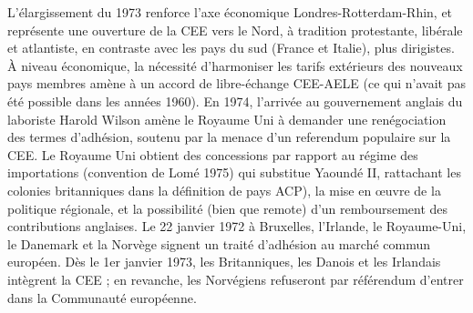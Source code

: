 \documentclass{report}%
\begin{document}
L’élargissement du 1973 renforce l’axe économique Londres-Rotterdam-Rhin, et représente une ouverture de la CEE vers le Nord, à tradition protestante, libérale et atlantiste, en contraste avec les pays du sud (France et Italie), plus dirigistes. À niveau économique, la nécessité d’harmoniser les tarifs extérieurs des nouveaux pays membres amène à un accord de libre-échange CEE-AELE (ce qui n’avait pas été possible dans les années 1960).
En 1974, l’arrivée au gouvernement anglais du laboriste Harold Wilson amène le Royaume Uni à demander une renégociation des termes d’adhésion, soutenu par la menace d’un referendum populaire sur la CEE. Le Royaume Uni obtient des concessions par rapport au régime des importations (convention de Lomé 1975) qui substitue Yaoundé II, rattachant les colonies britanniques dans la définition de pays ACP), la mise en œuvre de la politique régionale, et la possibilité (bien que remote) d’un remboursement des contributions anglaises.
Le 22 janvier 1972 à Bruxelles, l'Irlande, le Royaume-Uni, le Danemark et la Norvège signent un traité d'adhésion au marché commun européen. Dès le 1er janvier 1973, les Britanniques, les Danois et les Irlandais intègrent la CEE ; en revanche, les Norvégiens refuseront par référendum d'entrer dans la Communauté européenne.
\end{document}
